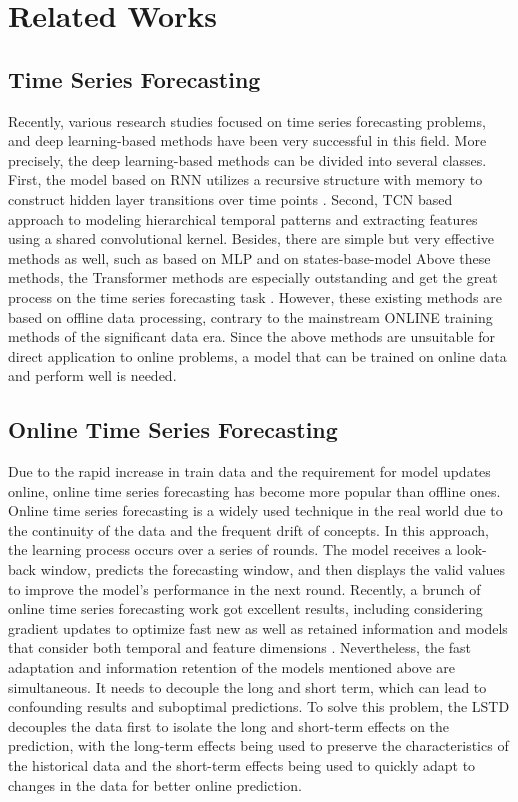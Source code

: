 \section{Related Works}
\subsection{Time Series Forecasting}
Recently, various research studies focused on time series forecasting problems, and deep learning-based methods have been very successful in this field. More precisely, the deep learning-based methods can be divided into several classes. First, the model based on RNN utilizes a recursive structure with memory to construct hidden layer transitions over time points . Second, TCN based approach to modeling hierarchical temporal patterns and extracting features using a shared convolutional kernel. Besides, there are simple but very effective methods as well, such as based on MLP  and on states-base-model  
Above these methods, the Transformer methods are especially outstanding and get the great process on the time series forecasting task \cite{kitaev2020reformer,liu2021pyraformer,wu2021autoformer,zhou2021informer}.
However, these existing methods are based on offline data processing, contrary to the mainstream ONLINE training methods of the significant data era. Since the above methods are unsuitable for direct application to online problems, a model that can be trained on online data and perform well is needed.
\subsection{Online Time Series Forecasting}
Due to the rapid increase in train data and the requirement for model updates online, online time series forecasting has become more popular than offline ones\cite{liu2016online,gultekin2018online,aydore2019dynamic}.
Online time series forecasting is a widely used technique in the real world due to the continuity of the data and the frequent drift of concepts. In this approach, the learning process occurs over a series of rounds. The model receives a look-back window, predicts the forecasting window, and then displays the valid values to improve the model's performance in the next round. Recently, a brunch of online time series forecasting work got excellent results, including considering gradient updates to optimize fast new as well as retained information \cite{pham2022learning} and models that consider both temporal and feature dimensions \cite{wen2024onenet}. Nevertheless, the fast adaptation and information retention of the models mentioned above are simultaneous. It needs to decouple the long and short term, which can lead to confounding results and suboptimal predictions. To solve this problem, the LSTD decouples the data first to isolate the long and short-term effects on the prediction, with the long-term effects being used to preserve the characteristics of the historical data and the short-term effects being used to quickly adapt to changes in the data for better online prediction.
